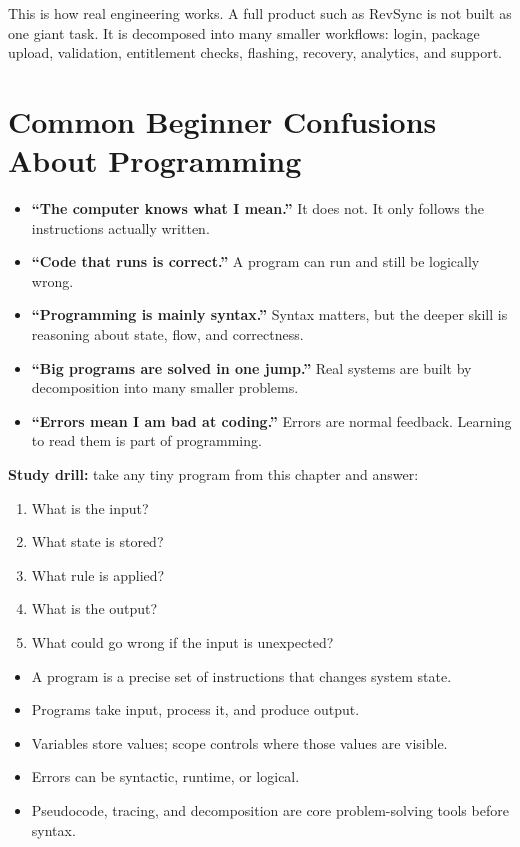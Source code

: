 \documentclass[12pt, a4paper, oneside]{book}
\begin{document}
\begin{projectbox}
This is how real engineering works. A full product such as RevSync is not built as one giant task. It is decomposed into many smaller workflows: login, package upload, validation, entitlement checks, flashing, recovery, analytics, and support.
\end{projectbox}

\section{Common Beginner Confusions About Programming}

\begin{itemize}[leftmargin=2em]
    \item \textbf{``The computer knows what I mean.''} It does not. It only follows the instructions actually written.
    \item \textbf{``Code that runs is correct.''} A program can run and still be logically wrong.
    \item \textbf{``Programming is mainly syntax.''} Syntax matters, but the deeper skill is reasoning about state, flow, and correctness.
    \item \textbf{``Big programs are solved in one jump.''} Real systems are built by decomposition into many smaller problems.
    \item \textbf{``Errors mean I am bad at coding.''} Errors are normal feedback. Learning to read them is part of programming.
\end{itemize}

\begin{exercisebox}
\textbf{Study drill:} take any tiny program from this chapter and answer:
\begin{enumerate}[leftmargin=2em]
    \item What is the input?
    \item What state is stored?
    \item What rule is applied?
    \item What is the output?
    \item What could go wrong if the input is unexpected?
\end{enumerate}
\end{exercisebox}

\begin{summarybox}
\begin{itemize}[leftmargin=2em]
    \item A program is a precise set of instructions that changes system state.
    \item Programs take input, process it, and produce output.
    \item Variables store values; scope controls where those values are visible.
    \item Errors can be syntactic, runtime, or logical.
    \item Pseudocode, tracing, and decomposition are core problem-solving tools before syntax.
\end{itemize}
\end{summarybox}
\end{document}
